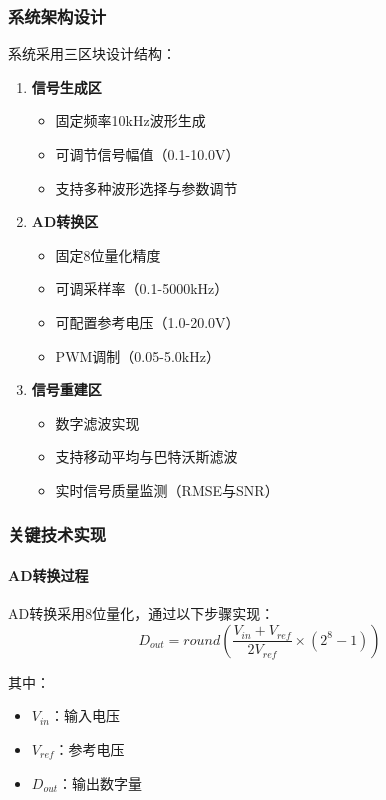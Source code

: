 \documentclass[12pt]{article}
\begin{document}
\subsubsection{系统架构设计}
系统采用三区块设计结构：
\begin{enumerate}
    \item \textbf{信号生成区}
    \begin{itemize}
        \item 固定频率10kHz波形生成
        \item 可调节信号幅值（0.1-10.0V）
        \item 支持多种波形选择与参数调节
    \end{itemize}
    
    \item \textbf{AD转换区}
    \begin{itemize}
        \item 固定8位量化精度
        \item 可调采样率（0.1-5000kHz）
        \item 可配置参考电压（1.0-20.0V）
        \item PWM调制（0.05-5.0kHz）
    \end{itemize}
    
    \item \textbf{信号重建区}
    \begin{itemize}
        \item 数字滤波实现
        \item 支持移动平均与巴特沃斯滤波
        \item 实时信号质量监测（RMSE与SNR）
    \end{itemize}
\end{enumerate}

\subsubsection{关键技术实现}
\paragraph{AD转换过程}
AD转换采用8位量化，通过以下步骤实现：
\begin{equation}
D_{out} = round(\frac{V_{in} + V_{ref}}{2V_{ref}} \times (2^8-1))
\end{equation}

其中：
\begin{itemize}
    \item $V_{in}$：输入电压
    \item $V_{ref}$：参考电压
    \item $D_{out}$：输出数字量
\end{itemize}
\end{document}
